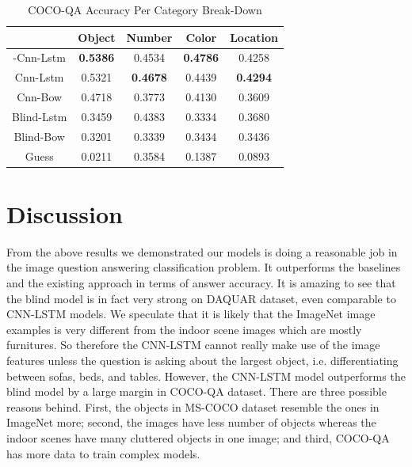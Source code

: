 \documentclass{article}
\renewcommand{\#}[1]{\textbf{#1}}
\begin{document}
\begin{table}[h]
\caption{COCO-QA Accuracy Per Category Break-Down}
\label{tab:cocoqa_acc_breakdown}
\vskip 0.15in
\begin{center}
\begin{small}
\begin{sc}
\begin{tabular}{c c c c c}
\hline
\abovespace\belowspace
           & Object    & Number   & Color    & Location \\
\hline
\abovespace
2-Cnn-Lstm & \#{0.5386}& 0.4534   &\#{0.4786}& 0.4258   \\
Cnn-Lstm   & 0.5321    &\#{0.4678}& 0.4439   &\#{0.4294}\\
Cnn-Bow    & 0.4718    & 0.3773   & 0.4130   & 0.3609   \\
Blind-Lstm & 0.3459    & 0.4383   & 0.3334   & 0.3680   \\
Blind-Bow  & 0.3201    & 0.3339   & 0.3434   & 0.3436   \\
\belowspace
Guess      & 0.0211    & 0.3584   & 0.1387   & 0.0893   \\
\hline
\end{tabular}
\end{sc}
\end{small}
\end{center}
\end{table}


\section{Discussion}
From the above results we demonstrated our models is doing a reasonable job in the image question answering classification problem. It outperforms the baselines and the existing approach in terms of answer accuracy. It is amazing to see that the blind model is in fact very strong on DAQUAR dataset, even comparable to CNN-LSTM models. We speculate that it is likely that the ImageNet image examples is very different from the indoor scene images which are mostly furnitures. So therefore the CNN-LSTM cannot really make use of the image features unless the question is asking about the largest object, i.e. differentiating between sofas, beds, and tables. However, the CNN-LSTM model outperforms the blind model by a large margin in COCO-QA dataset. There are three possible reasons behind. First, the objects in MS-COCO dataset resemble the ones in ImageNet more; second, the images have less number of objects whereas the indoor scenes have many cluttered objects in one image; and third, COCO-QA has more data to train complex models. 
\end{document}
